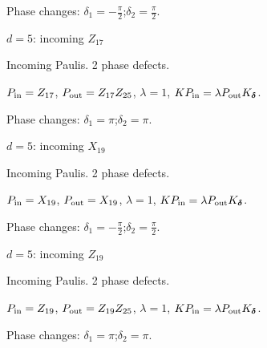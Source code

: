 \par\smallskip\begin{minipage}{.98\linewidth}\small Phase changes: $\delta_{1}=-\frac{\pi}{2}$;\quad $\delta_{2}=\frac{\pi}{2}$.\end{minipage}
\vfill
{\footnotesize\texttt{}}
\newpage
{}
{\Large $d=5$: incoming $Z_{17}$}\par
Incoming Paulis. 2 phase defects.
\begin{center}
\end{center}
\vspace{-1mm}
$P_{\rm in}=Z_{17}$, \quad $P_{\rm out}=Z_{17}Z_{25}$, \quad $\lambda=1$, \qquad $K P_{\rm in}=\lambda P_{\rm out}K_{\boldsymbol\delta}$.
\par\smallskip\begin{minipage}{.98\linewidth}\small Phase changes: $\delta_{1}=\pi$;\quad $\delta_{2}=\pi$.\end{minipage}
\vfill
{\footnotesize\texttt{}}
\newpage
{}
{\Large $d=5$: incoming $X_{19}$}\par
Incoming Paulis. 2 phase defects.
\begin{center}
\end{center}
\vspace{-1mm}
$P_{\rm in}=X_{19}$, \quad $P_{\rm out}=X_{19}$, \quad $\lambda=1$, \qquad $K P_{\rm in}=\lambda P_{\rm out}K_{\boldsymbol\delta}$.
\par\smallskip\begin{minipage}{.98\linewidth}\small Phase changes: $\delta_{1}=-\frac{\pi}{2}$;\quad $\delta_{2}=\frac{\pi}{2}$.\end{minipage}
\vfill
{\footnotesize\texttt{}}
\newpage
{}
{\Large $d=5$: incoming $Z_{19}$}\par
Incoming Paulis. 2 phase defects.
\begin{center}
\end{center}
\vspace{-1mm}
$P_{\rm in}=Z_{19}$, \quad $P_{\rm out}=Z_{19}Z_{25}$, \quad $\lambda=1$, \qquad $K P_{\rm in}=\lambda P_{\rm out}K_{\boldsymbol\delta}$.
\par\smallskip\begin{minipage}{.98\linewidth}\small Phase changes: $\delta_{1}=\pi$;\quad $\delta_{2}=\pi$.\end{minipage}

